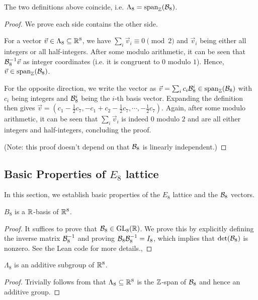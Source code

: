 \begin{theorem}\label{E8-defs-equivalent}\leanok
  The two definitions above coincide, i.e. $\Lambda_8 = \mathrm{span}_{\mathbb{Z}}(\mathcal{B}_8)$.
\end{theorem}
\begin{proof}\leanok
  We prove each side contains the other side.

  For a vector $\vec{v} \in \Lambda_8 \subseteq \mathbb{R}^8$, we have $\sum_i \vec{v}_i \equiv 0 \pmod{2}$ and $\vec{v}_i$ being either all integers or all half-integers. After some modulo arithmetic, it can be seen that $\mathcal{B}_8^{-1}\vec{v}$ as integer coordinates (i.e. it is congruent to $0$ modulo $1$). Hence, $\vec{v} \in \mathrm{span}_{\mathbb{Z}}(\mathcal{B}_8)$.

  For the opposite direction, we write the vector as $\vec{v} = \sum_i c_i\mathcal{B}_8^i \in \mathrm{span}_{\mathbb{Z}}(\mathcal{B}_8)$ with $c_i$ being integers and $\mathcal{B}_8^i$ being the $i$-th basis vector. Expanding the definition then gives $\vec{v} = \left(c_1 - \frac{1}{2}c_7, -c_1 + c_2 - \frac{1}{2}c_7, \cdots, -\frac{1}{2}c_7\right)$. Again, after some modulo arithmetic, it can be seen that $\sum_i \vec{v}_i$ is indeed $0$ modulo $2$ and are all either integers and half-integers, concluding the proof.

  (Note: this proof doesn't depend on that $\mathcal{B}_8$ is linearly independent.)
\end{proof}

\subsection{Basic Properties of $E_8$ lattice}

In this section, we establish basic properties of the $E_8$ lattice and the $\mathcal{B}_8$ vectors.

\begin{lemma}\label{E8-is-basis}\leanok
  $B_8$ is a $\mathbb{R}$-basis of $\mathbb{R}^8$.
\end{lemma}
\begin{proof}\leanok
  It suffices to prove that $\mathcal{B}_8 \in \mathrm{GL}_8(\mathbb{R})$. We prove this by explicitly defining the inverse matrix $\mathcal{B}_8^{-1}$ and proving $\mathcal{B}_8 \mathcal{B}_8^{-1} = I_8$, which implies that $\det(\mathcal{B}_8)$ is nonzero. See the Lean code for more details.,
\end{proof}

\begin{lemma}\label{E8-Lattice}\leanok
  $\Lambda_8$ is an additive subgroup of $\mathbb{R}^8$.
\end{lemma}
\begin{proof}\leanok
  Trivially follows from that $\Lambda_8 \subseteq \mathbb{R}^8$ is the $\mathbb{Z}$-span of $\mathcal{B}_8$ and hence an additive group.
\end{proof}

